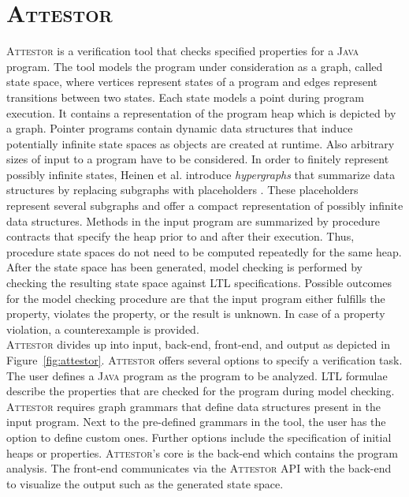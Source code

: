 \documentclass[a4paper, 12pt, twoside]{report}
\begin{document}
	\section{\textsc{Attestor}}\label{sec:attestor}
	
	\textsc{Attestor} is a verification tool that checks specified properties for a \textsc{Java} program. The tool models the program under consideration as a graph, called state space, where vertices represent states of a program and edges represent transitions between two states. Each state models a point during program execution. It contains a representation of the program heap which is depicted by a graph. Pointer programs contain dynamic data structures that induce potentially infinite state spaces as objects are created at runtime. Also arbitrary sizes of input to a program have to be considered. In order to finitely represent possibly infinite states, Heinen et al. introduce \textit{hypergraphs} that summarize data structures by replacing subgraphs with placeholders \cite{heinen2015juggrnaut}. These placeholders represent several subgraphs and offer a compact representation of possibly infinite data structures. Methods in the input program are summarized by procedure contracts that specify the heap prior to and after their execution. Thus, procedure state spaces do not need to be computed repeatedly for the same heap. After the state space has been generated, model checking is performed by checking the resulting state space against LTL specifications. Possible outcomes for the model checking procedure are that the input program either fulfills the property, violates the property, or the result is unknown. In case of a property violation, a counterexample is provided.\\
	
	\textsc{Attestor} divides up into input, back-end, front-end, and output as depicted in Figure~\ref{fig:attestor}. \textsc{Attestor} offers several options to specify a verification task. The user defines a \textsc{Java} program as the program to be analyzed. LTL formulae describe the properties that are checked for the program during model checking. \textsc{Attestor} requires graph grammars that define data structures present in the input program. Next to the pre-defined grammars in the tool, the user has the option to define custom ones. Further options include the specification of initial heaps or properties. \textsc{Attestor}'s core is the back-end which contains the program analysis. The front-end communicates via the \textsc{Attestor} API with the back-end to visualize the output such as the generated state space.\\	
	
\end{document}
